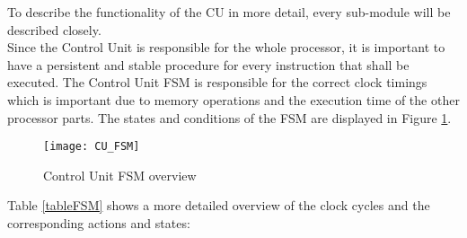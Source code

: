 To describe the functionality of the CU in more detail, every sub-module will be described closely.\\
Since the Control Unit is responsible for the whole processor, it is important to have a persistent and stable procedure for every instruction that shall be executed. The Control Unit \ac{FSM} is responsible for the correct clock timings which is important due to memory operations and the execution time of the other processor parts. The states and conditions of the FSM are displayed in Figure \ref{fig:cufsm}. 

\begin{figure}[H]
	\centering
	\texttt{[image: CU\_FSM]}
	\caption{Control Unit FSM overview}
	\label{fig:cufsm}
\end{figure}

Table \ref{tableFSM} shows a more detailed overview of the clock cycles and the corresponding actions and states:\\

\begin{table}[h]
\caption{Timing of FSM}
\label{tableFSM}
\end{table}

